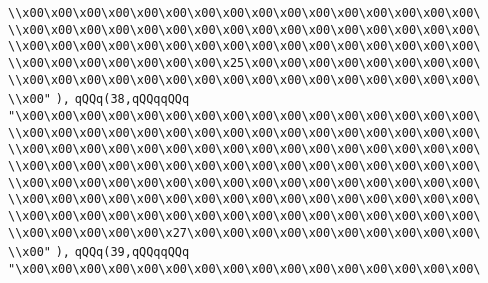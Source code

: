 \verb|\\x00\x00\x00\x00\x00\x00\x00\x00\x00\x00\x00\x00\x00\x00\x00\x00\|\newline
\verb|\\x00\x00\x00\x00\x00\x00\x00\x00\x00\x00\x00\x00\x00\x00\x00\x00\|\newline
\verb|\\x00\x00\x00\x00\x00\x00\x00\x00\x00\x00\x00\x00\x00\x00\x00\x00\|\newline
\verb|\\x00\x00\x00\x00\x00\x00\x00\x25\x00\x00\x00\x00\x00\x00\x00\x00\|\newline
\verb|\\x00\x00\x00\x00\x00\x00\x00\x00\x00\x00\x00\x00\x00\x00\x00\x00\|\newline
\verb|\\x00"|\newline
\verb|),|\newline
\verb|qQQq(38,qQQqqQQq|\newline
\verb|"\x00\x00\x00\x00\x00\x00\x00\x00\x00\x00\x00\x00\x00\x00\x00\x00\|\newline
\verb|\\x00\x00\x00\x00\x00\x00\x00\x00\x00\x00\x00\x00\x00\x00\x00\x00\|\newline
\verb|\\x00\x00\x00\x00\x00\x00\x00\x00\x00\x00\x00\x00\x00\x00\x00\x00\|\newline
\verb|\\x00\x00\x00\x00\x00\x00\x00\x00\x00\x00\x00\x00\x00\x00\x00\x00\|\newline
\verb|\\x00\x00\x00\x00\x00\x00\x00\x00\x00\x00\x00\x00\x00\x00\x00\x00\|\newline
\verb|\\x00\x00\x00\x00\x00\x00\x00\x00\x00\x00\x00\x00\x00\x00\x00\x00\|\newline
\verb|\\x00\x00\x00\x00\x00\x00\x00\x00\x00\x00\x00\x00\x00\x00\x00\x00\|\newline
\verb|\\x00\x00\x00\x00\x00\x27\x00\x00\x00\x00\x00\x00\x00\x00\x00\x00\|\newline
\verb|\\x00"|\newline
\verb|),|\newline
\verb|qQQq(39,qQQqqQQq|\newline
\verb|"\x00\x00\x00\x00\x00\x00\x00\x00\x00\x00\x00\x00\x00\x00\x00\x00\|\newline
